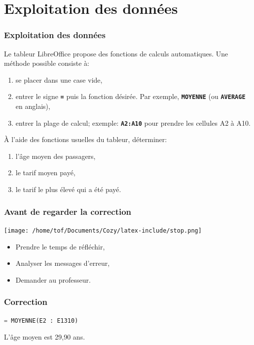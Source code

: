 \documentclass[svgnames,11pt]{beamer}
\begin{document}
\section{Exploitation des données}
\begin{frame}
    \frametitle{Exploitation des données}

    Le tableur LibreOffice propose des fonctions de calculs automatiques. Une méthode possible consiste à:
\begin{enumerate}
    \item se placer dans une case vide,
    \item entrer le signe \textbf{\texttt{=}} puis la fonction désirée. Par exemple, \textbf{\texttt{MOYENNE}} (ou \textbf{\texttt{AVERAGE}} en anglais),
    \item entrer la plage de calcul; exemple: \textbf{\texttt{A2:A10}} pour prendre les cellules A2 à A10.
\end{enumerate}

\end{frame}
\begin{frame}

    \begin{activite}
        À l’aide des fonctions usuelles du tableur, déterminer:
    \begin{enumerate}
        \item l’âge moyen des passagers,
        \item le tarif moyen payé,
        \item le tarif le plus élevé qui a été payé.
    \end{enumerate}
    \end{activite}

\end{frame}
\begin{frame}
    \frametitle{Avant de regarder la correction}
\begin{center}
    \centering
    \texttt{[image: /home/tof/Documents/Cozy/latex-include/stop.png]}
    \end{center}
{\Large
    \begin{itemize}
        \item Prendre le temps de réfléchir,
        \item Analyser les messages d'erreur,
        \item Demander au professeur.
    \end{itemize}
}
\end{frame}
\begin{frame}[fragile]
    \frametitle{Correction}

    \begin{center}
    \begin{lstlisting}[language=Python , basicstyle=\small, xleftmargin=2em, xrightmargin=2em]
= MOYENNE(E2 : E1310)
\end{lstlisting}
    \label{age}
    \end{center}
L'âge moyen est 29,90 ans.
\end{frame}
\end{document}
